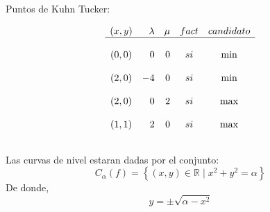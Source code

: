 \begin{enumerate}
\begin{itemize}
\begin{itemize}
		\end{itemize}

	\end{itemize}

	Puntos de Kuhn Tucker:

	$$
	\begin{array}{*{5}{crrcc}}
	    (x,y) & \lambda & \mu & fact & candidato\\
	    \hline\\
	    (0,0)&0&0&si&\min\\\\
	    (2,0)&-4&0&si&\min\\\\
	    (2,0)&0&2&si&\max\\\\
	    (1,1)&2&0&si&\max\\\\
	\end{array}
	$$

	Las curvas de nivel estaran dadas por el conjunto:
	$$C_\alpha (f) = \left\{ (x,y) \in \mathbb{R} \; | \; x^2+y^2=\alpha \right\}$$
	De donde,
	$$y=\pm\sqrt{\alpha -x^2}$$


\end{enumerate}
